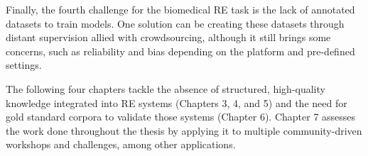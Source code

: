 Finally, the fourth challenge for the biomedical RE task is the lack of annotated datasets to train models. One solution can be creating these datasets through distant supervision allied with crowdsourcing, although it still brings some concerns, such as reliability and bias depending on the platform and pre-defined settings.  

The following four chapters tackle the absence of structured, high-quality knowledge integrated into RE systems (Chapters 3, 4, and 5) and the need for gold standard corpora to validate those systems (Chapter 6). Chapter 7 assesses the work done throughout the thesis by applying it to multiple community-driven workshops and challenges, among other applications.  

